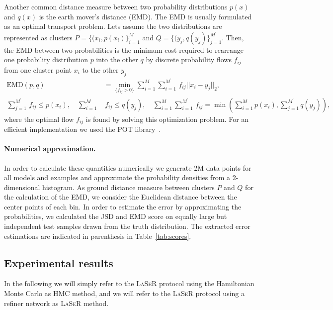 Another common distance measure between two probability distributions $p(x)$ and $q(x)$ is the earth mover's distance (EMD). The EMD is usually formulated as an optimal transport problem. Lets assume the two distributions are represented as clusters $P=\{(x_i,p(x_i)\}_{i=1}^M$ and $Q=\{(y_j,q(y_j)\}_{j=1}^{M^\prime}$. Then, the EMD between two probabilities is the minimum cost required to rearrange one probability distribution $p$ into the other $q$ by discrete probability flows $f_{ij}$ from one cluster point $x_i$ to the other $y_j$
\begin{equation}
\begin{split}
\mathrm{EMD}(p,q)&=\min_{\{f_{ij}>0\}}\sum_{i=1}^M \sum_{i=1}^{M^\prime}\,f_{ij}||x_i - y_j||_2, \\
    \sum_{j=1}^{M^\prime}\,f_{ij}\leq p(x_i),\quad \sum_{i=1}^{M}&\,f_{ij}\leq q(y_j),\quad
    \sum_{i=1}^M \sum_{i=1}^{M^\prime}\,f_{ij}=\min\left(\sum_{i=1}^{M}p(x_i), \sum_{j=1}^{M^\prime}q(y_j)\right),
\end{split}
\end{equation}
where the optimal flow $f_{ij}$ is found by solving this optimization problem. For an efficient implementation we used the \textsc{POT} library~\cite{flamary2021pot}.

\paragraph{Numerical approximation.}
In order to calculate these quantities numerically we generate 2M data points for all models and examples and approximate the probability densities from a 2-dimensional histogram. As ground distance measure between clusters $P$ and $Q$ for the calculation of the EMD, we consider the Euclidean distance between the center points of each bin. In order to estimate the error by approximating the probabilities, we calculated the JSD and EMD score on equally large but independent test samples drawn from the truth distribution. The extracted error estimations are indicated in parenthesis in Table~\ref{tab:scores}.

\subsection{Experimental results}
\label{sec:results}

In the following we will simply refer to the \textsc{LaSeR} protocol using the Hamiltonian Monte Carlo as HMC method, and we will refer to the \textsc{LaSeR} protocol using a refiner network as \textsc{LaSeR} method.

